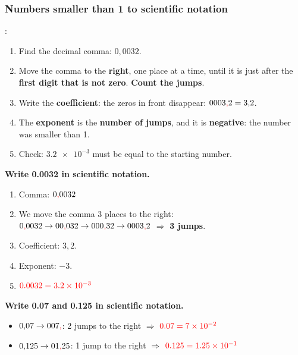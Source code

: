 
\subsubsection{Numbers smaller than 1 to scientific notation}

:
\begin{enumerate}[label=\numberballmDarkTeal]
    \item Find the decimal comma: \(0{,}0032\).
    \item Move the comma to the \textbf{right}, one place at a time, until it is just after the \textbf{first digit that is not zero}. \textbf{Count the jumps}.
    \item Write the \textbf{coefficient}: the zeros in front disappear: \(0003\textcolor{red}{\mathbf{,}} 2 = 3{,}2\).
    \item The \textbf{exponent} is the \textbf{number of jumps}, and it is \textbf{negative}: the number was smaller than 1.
    \item Check: \(\num{3.2e-3}\) must be equal to the starting number.
\end{enumerate}

\begin{example}
    \textbf{Write \num{0.0032} in scientific notation.}
    \begin{enumerate}[label=\numberballmDarkTeal]
        \item Comma: \(0\textcolor{red}{\mathbf{,}} 0032\)
        \item We move the comma 3 places to the right: \(0\textcolor{red}{\mathbf{,}} 0032 \to 00\textcolor{red}{\mathbf{,}} 032 \to 000\textcolor{red}{\mathbf{,}} 32 \to 0003\textcolor{red}{\mathbf{,}} 2\) \(\Rightarrow\) \textbf{3 jumps}.
        \item Coefficient: \(3{,}2\).
        \item Exponent: \(-3\).
        \item \(\textcolor{red}{\num{0.0032} = \num{3.2e-3}}\)
    \end{enumerate}
\end{example}

\begin{example}
    \textbf{Write \num{0.07} and \num{0.125} in scientific notation.}
    \begin{itemize}
        \item \(0{,}07 \to 007\textcolor{red}{\mathbf{,}}\): 2 jumps to the right \(\Rightarrow\) \(\textcolor{red}{\num{0.07} = \num{7e-2}}\)
        \item \(0{,}125 \to 01\textcolor{red}{\mathbf{,}} 25\): 1 jump to the right \(\Rightarrow\) \(\textcolor{red}{\num{0.125} = \num{1.25e-1}}\)
    \end{itemize}
\end{example}

